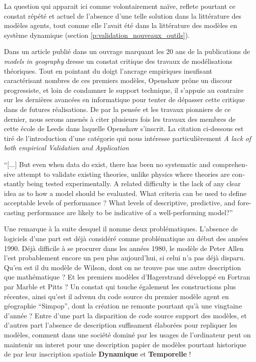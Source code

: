 La question qui apparait ici comme volontairement naïve, reflete pourtant ce constat répété et actuel de l'absence d'une telle solution dans la littérature des modèles agents, tout comme elle l'avait été dans la littérature des modèles en système dynamique (section \ref{p:validation_nouveaux_outils}).

Dans un article publié dans un ouvrage marquant les 20 ans de la publications de \textit{models in geography} \textcite{Openshaw1989} dresse un constat critique des travaux de modélisations théoriques. Tout en pointant du doigt l'ancrage empiriques insufisant caractérisant nombres de ces premiers modèles, Openshaw prône un discour progressiste, et loin de condamner le support technique, il s'appuie au contraire sur les dernières avancées en informatique pour tenter de dépasser cette critique dans de futures réalisations. De par la pensée et les travaux pionniers de ce dernier, nous serons amenés à citer plusieurs fois les travaux des membres de cette école de Leeds dans laquelle Openshaw s'inscrit. La citation ci-dessous est tiré de l'introduction d'une catégorie qui nous intéresse particulièrement \textit{A lack of both empirical Validation and Application} 

\foreignquote{english}{[...] But even when data do exist, there has been no systematic and comprehensive attempt to validate existing theories, unlike physics where theories are constantly being tested experimentally. A related difficulty is the lack of any clear idea as to how a model should be evaluated. What criteria can be used to define acceptable levels of performance ? What levels of descriptive, predictive, and forecasting performance are likely to be indicative of a well-performing model?} \autocite[78]{Openshaw1989}

Une remarque à la suite desquel il nomme deux problématiques. L'absence de logiciels d'une part  est déjà considéré comme problématique au début des années 1990. Déjà difficile à se procurer dans les années 1980, le modèle de Peter Allen l'est probablement encore un peu plus aujourd'hui, si celui n'a pas déjà disparu. Qu'en est il du modèle de Wilson, dont on ne trouve pas une autre description que mathématique ? Et les premiers modèles d'Hagerstrand développé en Fortran par Marble et Pitts ? Un constat qui touche également les constructions plus récentes, ainsi qu'est il advenu du code source du premier modèle agent en géographie \enquote{Simpop}, dont la création ne remonte pourtant qu'à une vingtaine d'année ? Entre d'une part la disparition de code source support des modèles, et d'autres part l'absence de description suffisament élaborées pour repliquer les modèles, comment dans une société dominé par les usages de l'ordinateur peut on maintenir un interet pour une description papier de modèles pourtant historique de par leur inscription spatiale \textbf{Dynamique} et \textbf{Temporelle} !

